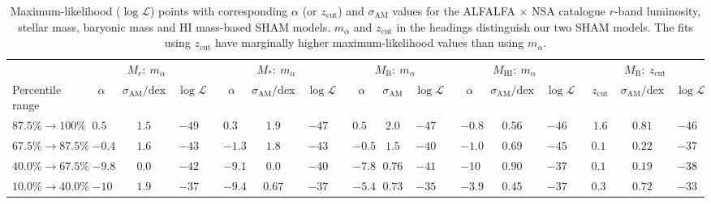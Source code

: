 \documentclass[usenatbib,useAMS]{mnras}
\newcommand{\zcut}{\ensuremath{z_{\mathrm{cut}}}}
\newcommand{\HI}{\ensuremath{\mathrm{H}\scriptstyle\mathrm{I}}}
\newcommand{\scatter}{\ensuremath{\sigma_{\mathrm{AM}}}}
\newcommand{\matched}{ALFALFA $\times$ NSA }
\begin{document}
\begin{table}
\setlength{\tabcolsep}{2.75pt}
\begin{tabular}{llccccccccccccccccccc}
          & & \multicolumn{3}{c}{$M_r:~m_\alpha$}  &  & \multicolumn{3}{c}{$M_*:~m_\alpha$} &  & \multicolumn{3}{c}{$M_{\mathrm{B}}:~m_\alpha$}  &  & \multicolumn{3}{c}{$M_{\mathrm{HI}}:~m_\alpha$} &  & \multicolumn{3}{c}{$M_{\mathrm{B}}:~\zcut$} \\ \cline{3-5} \cline{7-9} \cline{11-13} \cline{15-17} \cline{19-21}
          Percentile range & & $\alpha$   & $\scatter/\mathrm{dex}$ & $\log\mathcal{L}$    &  & $\alpha$  & $\scatter/\mathrm{dex}$ & $\log\mathcal{L}$    &  & $\alpha$   & $\scatter$ & $\log\mathcal{L}$    &  & $\alpha$   & $\scatter/\mathrm{dex}$ & $\log\mathcal{L}$ &  & $\zcut$   & $\scatter/\mathrm{dex}$ & $\log\mathcal{L}$    \\ \cline{1-1} \cline{3-5} \cline{7-9} \cline{11-13} \cline{15-17} \cline{19-21}
$87.5\% \rightarrow 100\%$ & & $0.50$  & $1.5$   & $-49$ &  & $0.33$ & $1.9$   & $-47$ &  & $0.59$  & $2.0$   & $-47$ &  & $-0.89$ & $0.56$  & $-46$  &  & $1.6$ & $0.81$  & $-46$\\
$67.5\% \rightarrow 87.5\%$  & & $-0.45$ & $1.6$   & $-43$ &  & $-1.3$ & $1.8$   & $-43$ &  & $-0.50$ & $1.5$   & $-40$ &  & $-1.0$  & $0.69$  & $-45$ &  & $0.13$ & $0.22$  & $-37$\\
$40.0\% \rightarrow 67.5\%$  & & $-9.8$  & $0.0$   & $-42$ &  & $-9.1$ & $0.0$   & $-40$ &  & $-7.8$  & $0.76$  & $-41$ &  & $-10$   & $0.90$  & $-37$ &  & $0.10$ & $0.19$  & $-38$\\
$10.0\% \rightarrow 40.0\%$   & & $-10$   & $1.9$   & $-37$ &  & $-9.4$ & $0.67$  & $-37$ &  & $-5.4$  & $0.73$  & $-35$ &  & $-3.9$  & $0.45$  & $-37$ &  & $0.32$ & $0.72$  & $-33$ \\ \cline{1-1} \cline{3-5} \cline{7-9} \cline{11-13} \cline{15-17} \cline{19-21}
\end{tabular}
\caption{Maximum-likelihood ($\log\mathcal{L}$) points with corresponding $\alpha$ (or $\zcut$) and $\scatter$ values for the \matched catalogue $r$-band luminosity, stellar mass, baryonic mass and $\HI$ mass-based \ac{SHAM} models. $m_\alpha$ and $\zcut$ in the headings distinguish our two \ac{SHAM} models. The fits using $\zcut$ have marginally higher maximum-likelihood values than using $m_\alpha$.}
\label{tab:ML_HIbins}
\end{table}

\end{document}
